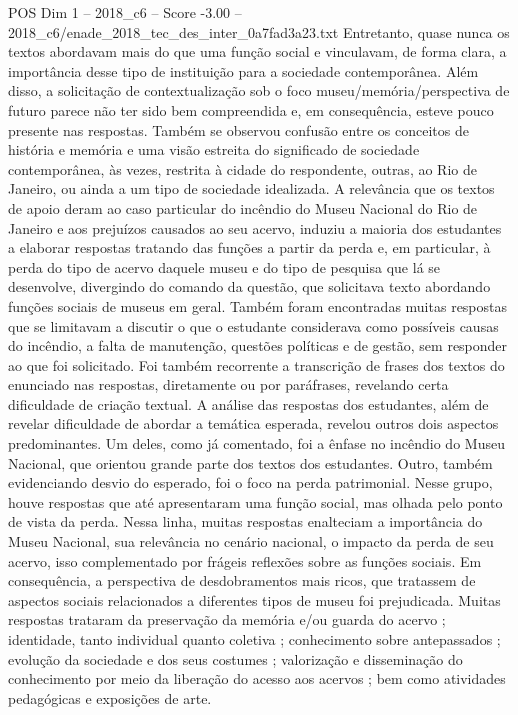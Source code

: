 \begin{textsample}{POS Dim 1 – 2018\_c6 – Score -3.00 – 2018\_c6/enade\_2018\_tec\_des\_inter\_0a7fad3a23.txt}
Entretanto, quase nunca os textos abordavam mais do que uma função social e vinculavam, de forma clara, a importância desse tipo de instituição para a sociedade contemporânea.
Além disso, a solicitação de contextualização sob o foco museu/memória/perspectiva de futuro parece não ter sido bem compreendida e, em consequência, esteve pouco presente nas respostas.
Também se observou confusão entre os conceitos de história e memória e uma visão estreita do significado de sociedade contemporânea, às vezes, restrita à cidade do respondente, outras, ao Rio de Janeiro, ou ainda a um tipo de sociedade idealizada.
A relevância que os textos de apoio deram ao caso particular do incêndio do Museu Nacional do Rio de Janeiro e aos prejuízos causados ao seu acervo, induziu a maioria dos estudantes a elaborar respostas tratando das funções a partir da perda e, em particular, à perda do tipo de acervo daquele museu e do tipo de pesquisa que lá se desenvolve, divergindo do comando da questão, que solicitava texto abordando funções sociais de museus em geral.
Também foram encontradas muitas respostas que se limitavam a discutir o que o estudante considerava como possíveis causas do incêndio, a falta de manutenção, questões políticas e de gestão, sem responder ao que foi solicitado.
Foi também recorrente a transcrição de frases dos textos do enunciado nas respostas, diretamente ou por paráfrases, revelando certa dificuldade de criação textual.
A análise das respostas dos estudantes, além de revelar dificuldade de abordar a temática esperada, revelou outros dois aspectos predominantes.
Um deles, como já comentado, foi a ênfase no incêndio do Museu Nacional, que orientou grande parte dos textos dos estudantes.
Outro, também evidenciando desvio do esperado, foi o foco na perda patrimonial.
Nesse grupo, houve respostas que até apresentaram uma função social, mas olhada pelo ponto de vista da perda.
Nessa linha, muitas respostas enalteciam a importância do Museu Nacional, sua relevância no cenário nacional, o impacto da perda de seu acervo, isso complementado por frágeis reflexões sobre as funções sociais.
Em consequência, a perspectiva de desdobramentos mais ricos, que tratassem de aspectos sociais relacionados a diferentes tipos de museu foi prejudicada.
Muitas respostas trataram da preservação da memória e/ou guarda do acervo ; identidade, tanto individual quanto coletiva ; conhecimento sobre antepassados ; evolução da sociedade e dos seus costumes ; valorização e disseminação do conhecimento por meio da liberação do acesso aos acervos ; bem como atividades pedagógicas e exposições de arte.

\end{textsample}
